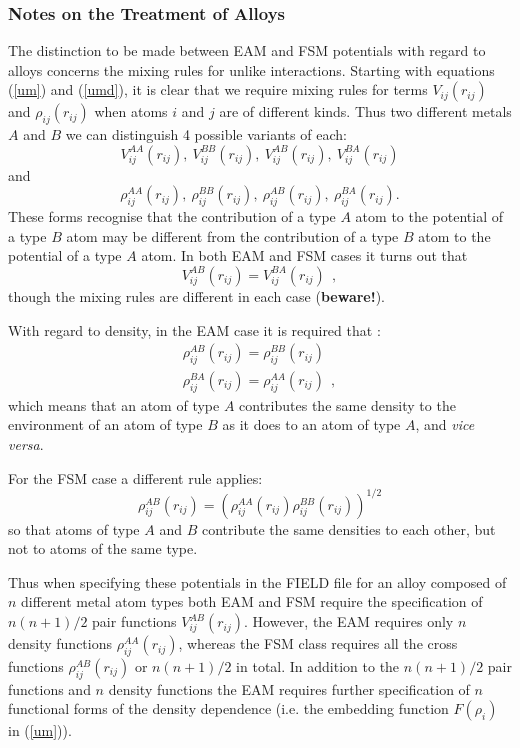 \subsubsection*{Notes on the Treatment of Alloys}
\label{comment_on_alloys}
The distinction to be made between EAM and FSM potentials with regard to
alloys concerns the mixing rules for unlike interactions.  Starting with
equations (\ref{um}) and (\ref{umd}), it is clear that we require mixing
rules for terms $V_{ij}(r_{ij})$ and $\rho_{ij}(r_{ij})$ when atoms $i$
and $j$ are of different kinds.  Thus two different metals $A$ and $B$ we
can distinguish 4 possible variants of each:
\[V^{AA}_{ij}(r_{ij}),~V^{BB}_{ij}(r_{ij}),~V^{AB}_{ij}(r_{ij}),
~V^{BA}_{ij}(r_{ij})\]
and
\[\rho^{AA}_{ij}(r_{ij}),~\rho^{BB}_{ij}(r_{ij}),~\rho^{AB}_{ij}(r_{ij}),
~\rho^{BA}_{ij}(r_{ij}).\]
These forms recognise that the contribution of a type $A$ atom to
the potential of a type $B$ atom may be different from the
contribution of a type $B$ atom to the potential of a type $A$ atom.
 In both EAM \cite{johnson-89a} and FSM \cite{rafii-tabar-91a} cases it
turns out that
\begin{equation}
V^{AB}_{ij}(r_{ij})=V^{BA}_{ij}(r_{ij})~~,
\end{equation}
though the mixing rules are different in each case ({\bf beware!}). 

With regard to density, in the EAM case it is required that 
\cite{johnson-89a}:
\begin{eqnarray}
\rho^{AB}_{ij}(r_{ij})=\rho^{BB}_{ij}(r_{ij}) \nonumber \\
\rho^{BA}_{ij}(r_{ij})=\rho^{AA}_{ij}(r_{ij})~~,
\end{eqnarray}
which means that an atom of type $A$ contributes the same density to
the environment of an atom of type $B$ as it does to an atom of type
$A$, and {\em vice versa}.

For the FSM case \cite{rafii-tabar-91a} a different rule applies:
\begin{equation}
\rho^{AB}_{ij}(r_{ij})=(\rho^{AA}_{ij}(r_{ij})\rho^{BB}_{ij}(r_{ij}))^{1/2}
\end{equation}
so that atoms of type $A$ and $B$ contribute the same densities to
each other, but not to atoms of the same type.

Thus when specifying these potentials in the \D{} FIELD file for
an alloy composed of $n$ different metal atom types both EAM and FSM
require the specification of $n(n+1)/2$ pair functions
$V^{AB}_{ij}(r_{ij})$.  However, the EAM requires only $n$ density
functions $\rho^{AA}_{ij}(r_{ij})$, whereas the FSM class requires all
the cross functions $\rho^{AB}_{ij}(r_{ij})$ or $n(n+1)/2$ in total.
In addition to the $n(n+1)/2$ pair functions and $n$ density functions
the EAM requires further specification of $n$ functional forms of the
density dependence (i.e. the embedding function $F(\rho_i)$ in (\ref{um})).

